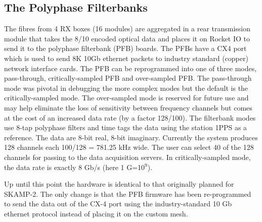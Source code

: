 \subsection{The Polyphase Filterbanks}
The fibres from 4 RX boxes (16 modules) are aggregated in a rear transmission module that takes the 8/10 encoded optical data and places it on Rocket IO to send it to the polyphase filterbank (PFB) boards. The PFBs have a CX4 port which is used to send 8K 10Gb ethernet packets to industry standard (copper) network interface cards. The PFB can be reprogrammed into one of three modes, pass-through, critically-sampled PFB and over-sampled PFB. The pass-through mode was pivotal in debugging the more complex modes but the default is the critically-sampled mode. The over-sampled mode is reserved for future use and may help eliminate the loss of sensitivity between frequency channels but comes at the cost of an increased data rate (by a factor 128/100). The filterbank modes use 8-tap polyphase filters and time tags the data using the station 1PPS as a reference. The data are 8-bit real, 8-bit imaginary. Currently the system produces 128 channels each 100/128 = 781.25 kHz wide. The user can select 40 of the 128 channels for passing to the data acquisition servers. In critically-sampled mode, the data rate is exactly 8 Gb/s (here 1 G=10$^9$).

Up until this point the hardware is identical to that originally planned for SKAMP-2. The only change is that the PFB firmware has been re-programmed to send the data out of the CX-4 port using the industry-standard 10 Gb ethernet protocol instead of placing it on the custom mesh.


